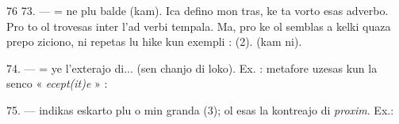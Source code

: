 \begin{VUpage}[80]{76}
\VUblanc{6.71pt}%
73. ---  = ne plu balde (kam). Ica defino mon\cc
tras, ke ta vorto esas adverbo. Pro to ol trovesas inter l'ad\cc
verbi tempala. Ma, pro ke ol semblas a kelki quaza prepo\cc
ziciono, ni repetas lu hike kun exempli : \nl
{} (2). \nl
{}\nl
{}\nl
{} (kam ni).

\VUblanc{5.70pt}%
74. ---  = ye l'exterajo di... (sen chanjo di loko).\nl
Ex. : \nl
{}\nl
{} metafore uzesas kun la senco « \textit{ecept(it)e} » : \nl
{}

\VUblanc{6.88pt}%
75. ---  indikas eskarto plu o min granda (3); ol\nl
esas la kontreajo di \textit{proxim}. Ex.: \parplein
\end{VUpage}

